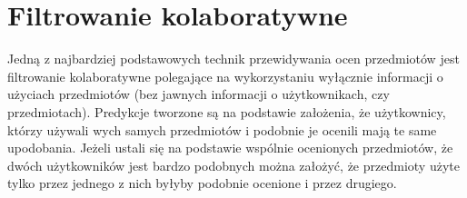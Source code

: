 \documentclass{pracamgr}
\begin{document}
  \section{Filtrowanie kolaboratywne}
   Jedną z najbardziej podstawowych technik przewidywania ocen przedmiotów jest filtrowanie kolaboratywne polegające na wykorzystaniu wyłącznie informacji
   o użyciach przedmiotów (bez jawnych informacji o użytkownikach, czy przedmiotach). Predykcje tworzone są na podstawie założenia, że użytkownicy,
   którzy używali wych samych przedmiotów i podobnie je ocenili mają te same upodobania. Jeżeli ustali się na podstawie wspólnie ocenionych przedmiotów,
   że dwóch użytkowników jest bardzo podobnych można założyć,
   że przedmioty użyte tylko przez jednego z nich byłyby podobnie ocenione i przez drugiego.
\end{document}
